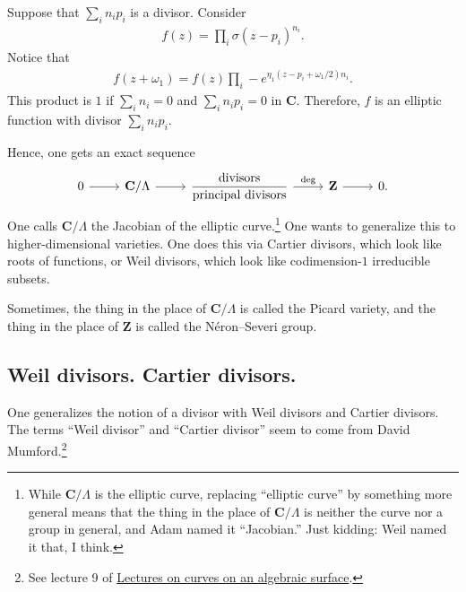 \documentclass [11 pt, oneside] {article}
\begin{document}
Suppose that $\sum_{i}^{} n_ip_i$ is a divisor. Consider
\begin{align*}
	f(z) = \prod_i \sigma (z-p_i) ^{n_i}.
\end{align*}
Notice that
\begin{align*}
	f(z+\omega_1) = f(z)\prod_i-e^{\eta_1(z-p_i+\omega_1/2)n_i}.
\end{align*}
This product is $1$ if $\sum_{i}^{} n_i=0$ and $\sum_{i}^{} n_ip_i=0$ in $\mathbf{C}$. Therefore, $f$ is an elliptic function with divisor $\sum_{i}^{} n_ip_i$.

Hence, one gets an exact sequence
\[
\begin{tikzcd}
	0\ar[r] & \mathbf{C}/\Lambda\ar[r]&\displaystyle \frac{\textrm{divisors}}{\textrm{principal divisors}}\ar[r,"\deg"]&\mathbf{Z}\ar[r]&0.
\end{tikzcd}
\]
One calls $\mathbf{C}/\Lambda$ the Jacobian of the elliptic curve.\footnote{While $\mathbf{C}/\Lambda$ is the elliptic curve, replacing ``elliptic curve'' by something more general means that the thing in the place of $\mathbf{C}/\Lambda$ is neither the curve nor a group in general, and Adam named it ``Jacobian.'' Just kidding: Weil named it that, I think.}
One wants to generalize this to higher-dimensional varieties. One does this via Cartier divisors, which look like roots of functions, or Weil divisors, which look like codimension-$1$ irreducible subsets.

Sometimes, the thing in the place of $\mathbf{C}/\Lambda$ is called the Picard variety, and the thing in the place of $\mathbf{Z}$ is called the N\'eron--Severi group.

\subsection{Weil divisors. Cartier divisors.}
One generalizes the notion of a divisor with Weil divisors and Cartier divisors. The terms ``Weil divisor'' and ``Cartier divisor'' seem to come from David Mumford.\footnote{See lecture 9 of \ul{Lectures on curves on an algebraic surface}.}

\end{document}
